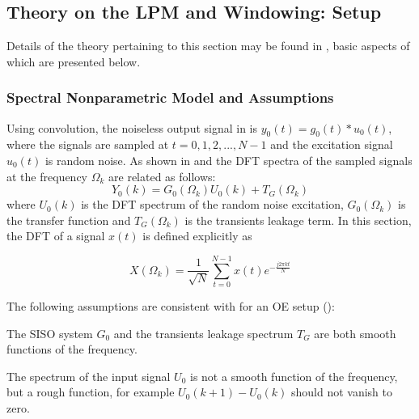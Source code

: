 \subsection{Theory on the LPM and Windowing:  Setup}
\label{se:theoryLPMandWindowing}

Details of the theory pertaining to this section may be found in \citep{Schoukens2009LPM}, basic aspects of which are presented below.


\subsubsection{Spectral Nonparametric Model and Assumptions}

Using convolution, the noiseless output signal in  is $y_0(t) = g_0(t)*u_0(t)$, where the signals are sampled at $t = 0, 1, 2,...,N-1$ and the excitation signal $u_0(t)$ is random noise. As shown in \citep{Pintelon2012} and \citep{Pintelon1997} the \gls{DFT} spectra of the sampled signals at the frequency $\Omega_k$ are related as follows:
\begin{equation}\label{eq:nparam:trunc:LPM:leakage}
Y_0(k)=G_0(\Omega_k)U_0(k)+T_G(\Omega_k)
\end{equation}
where $U_0(k)$ is the \gls{DFT} spectrum of the random noise excitation,  $G_0(\Omega_k)$ is the transfer function and $T_G(\Omega_k)$ is the transients leakage term.
In this section, the \gls{DFT} of a signal $x(t)$ is defined explicitly as  \citep{Oppenheim1983}

\begin{equation}\label{eq:defDFT}
X(\Omega_k) = \frac{1}{\sqrt{N}}\sum_{t=0}^{N-1}x(t)e^{-\frac{j2\pi kt}{N}}
\end{equation}


The following assumptions are consistent with \citep{Schoukens2009LPM} for an OE setup ():
\begin{assumption}
The \gls{SISO} system $G_0$ and  the transients leakage spectrum $T_G$ are both smooth functions of the frequency.
\end{assumption}



\begin{assumption}

The spectrum of the  input signal $U_0$ is not a smooth function of the frequency, but a rough function, for example $U_0(k+1) - U_0(k)$ should not vanish to zero. %
\end{assumption}

